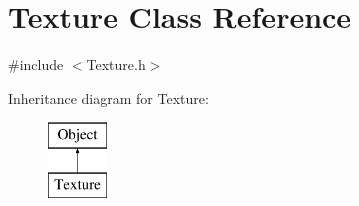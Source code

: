\hypertarget{class_texture}{}\section{Texture Class Reference}
\label{class_texture}


{\ttfamily \#include $<$Texture.\+h$>$}

Inheritance diagram for Texture\+:\begin{figure}[H]
\begin{center}
\leavevmode
\includegraphics[height=2.000000cm]{class_texture}
\end{center}
\end{figure}
